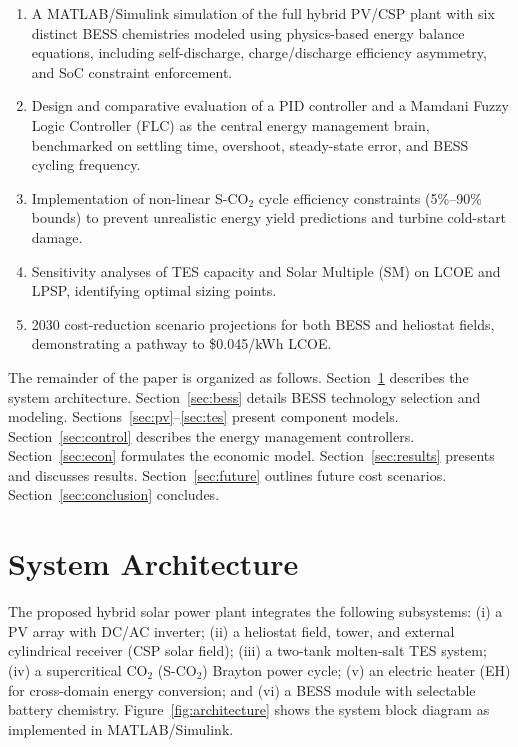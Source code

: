 \documentclass[journal]{IEEEtran}
\begin{document}
\begin{enumerate}
    \item A MATLAB/Simulink simulation of the full hybrid PV/CSP plant with six distinct BESS chemistries modeled using physics-based energy balance equations, including self-discharge, charge/discharge efficiency asymmetry, and SoC constraint enforcement.
    \item Design and comparative evaluation of a PID controller and a Mamdani Fuzzy Logic Controller (FLC) as the central energy management brain, benchmarked on settling time, overshoot, steady-state error, and BESS cycling frequency.
    \item Implementation of non-linear S-CO$_2$ cycle efficiency constraints (5\%--90\% bounds) to prevent unrealistic energy yield predictions and turbine cold-start damage.
    \item Sensitivity analyses of TES capacity and Solar Multiple (SM) on LCOE and LPSP, identifying optimal sizing points.
    \item 2030 cost-reduction scenario projections for both BESS and heliostat fields, demonstrating a pathway to \$0.045/kWh LCOE.
\end{enumerate}

The remainder of the paper is organized as follows. Section~\ref{sec:system} describes the system architecture. Section~\ref{sec:bess} details BESS technology selection and modeling. Sections~\ref{sec:pv}--\ref{sec:tes} present component models. Section~\ref{sec:control} describes the energy management controllers. Section~\ref{sec:econ} formulates the economic model. Section~\ref{sec:results} presents and discusses results. Section~\ref{sec:future} outlines future cost scenarios. Section~\ref{sec:conclusion} concludes.


\section{System Architecture}
\label{sec:system}

The proposed hybrid solar power plant integrates the following subsystems: (i) a PV array with DC/AC inverter; (ii) a heliostat field, tower, and external cylindrical receiver (CSP solar field); (iii) a two-tank molten-salt TES system; (iv) a supercritical CO$_2$ (S-CO$_2$) Brayton power cycle; (v) an electric heater (EH) for cross-domain energy conversion; and (vi) a BESS module with selectable battery chemistry. Figure~\ref{fig:architecture} shows the system block diagram as implemented in MATLAB/Simulink.
\end{document}
